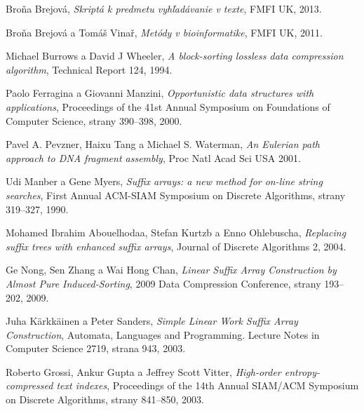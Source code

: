 \begin{thebibliography}{99}
 
        Broňa Brejová,
        \emph{Skriptá k predmetu vyhľadávanie v texte},
        FMFI UK,
        2013.
        
        Broňa Brejová a Tomáš Vinař,
        \emph{Metódy v bioinformatike},
        FMFI UK,
        2011.
        
        Michael Burrows a David J Wheeler,
        \emph{A block-sorting lossless data compression algorithm},     
        Technical Report 124,
        1994.
        
        Paolo Ferragina a Giovanni Manzini,
        \emph{Opportunistic data structures with applications},
        Proceedings of the 41st Annual Symposium on Foundations of Computer
        Science, strany 390--398,
        2000.
        
        Pavel A. Pevzner, Haixu Tang a Michael S. Waterman,
        \emph{An Eulerian path approach to DNA fragment assembly},
        Proc Natl Acad Sci USA
        2001.
        
        Udi Manber a Gene Myers,
        \emph{Suffix arrays: a new method for on-line string searches},
        First Annual ACM-SIAM Symposium on Discrete Algorithms, strany 319--327,
        1990.
        
        Mohamed Ibrahim Abouelhodaa, Stefan Kurtzb a Enno Ohlebuscha,
        \emph{Replacing suffix trees with enhanced suffix arrays},
        Journal of Discrete Algorithms 2,
        2004.
        
        Ge Nong, Sen Zhang a Wai Hong Chan,
        \emph{Linear Suffix Array Construction by Almost Pure Induced-Sorting},
        2009 Data Compression Conference, strany 193--202,
        2009.
        
        Juha Kärkkäinen a Peter Sanders,
        \emph{Simple Linear Work Suffix Array Construction},
        Automata, Languages and Programming. Lecture Notes in Computer Science
        2719, strana 943,
        2003.
        
        Roberto Grossi, Ankur Gupta a Jeffrey Scott Vitter,
        \emph{High-order entropy-compressed text indexes},
        Proceedings of the 14th Annual SIAM/ACM Symposium on Discrete Algorithms, strany 841--850,
        2003.
        

\end{thebibliography}
